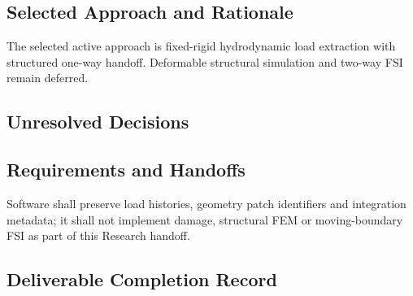 \subsection{Selected Approach and Rationale}
\label{sec:res-str-spec-selected-approach}

The selected active approach is fixed-rigid hydrodynamic load
extraction with structured one-way handoff. Deformable structural
simulation and two-way FSI remain deferred.

\subsection{Unresolved Decisions}
\label{sec:res-str-spec-unresolved-decisions}


\subsection{Requirements and Handoffs}
\label{sec:res-str-spec-requirements}

Software shall preserve load histories, geometry patch identifiers and
integration metadata; it shall not implement damage, structural FEM or
moving-boundary FSI as part of this Research handoff.

\subsection{Deliverable Completion Record}
\label{sec:res-str-spec-completion-record}

%
%
%
